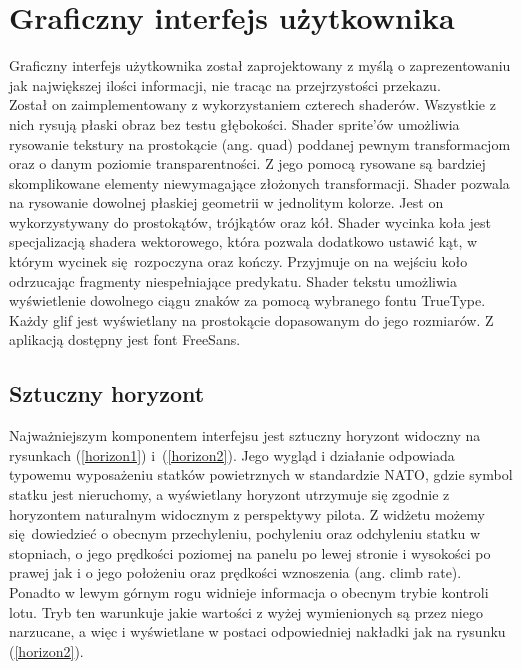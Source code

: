 \section{Graficzny interfejs użytkownika} \label{chapter_gui}

Graficzny interfejs użytkownika został zaprojektowany z myślą o zaprezentowaniu jak największej ilości informacji, nie tracąc na przejrzystości przekazu.
\\

Został on zaimplementowany z wykorzystaniem czterech shaderów. Wszystkie z nich rysują płaski obraz bez testu głębokości. Shader sprite'ów umożliwia rysowanie tekstury na prostokącie (ang. quad) poddanej pewnym transformacjom oraz o danym poziomie transparentności. Z jego pomocą rysowane są bardziej skomplikowane elementy niewymagające złożonych transformacji. Shader pozwala na rysowanie dowolnej płaskiej geometrii w jednolitym kolorze. Jest on wykorzystywany do prostokątów, trójkątów oraz kół. Shader wycinka koła jest specjalizacją shadera wektorowego, która pozwala dodatkowo ustawić kąt, w którym wycinek się rozpoczyna oraz kończy. Przyjmuje on na wejściu koło odrzucając fragmenty niespełniające predykatu. Shader tekstu umożliwia wyświetlenie dowolnego ciągu znaków za pomocą wybranego fontu TrueType. Każdy glif jest wyświetlany na prostokącie dopasowanym do jego rozmiarów. Z aplikacją dostępny jest font FreeSans.

\subsection{Sztuczny horyzont}

Najważniejszym komponentem interfejsu jest sztuczny horyzont widoczny na rysunkach (\ref{horizon1}) i~(\ref{horizon2}). Jego wygląd i działanie odpowiada typowemu wyposażeniu statków powietrznych w standardzie NATO, gdzie symbol statku jest nieruchomy, a wyświetlany horyzont utrzymuje się zgodnie z horyzontem naturalnym widocznym z perspektywy pilota. Z widżetu możemy się dowiedzieć o obecnym przechyleniu, pochyleniu oraz odchyleniu statku w stopniach, o jego prędkości poziomej na panelu po lewej stronie i wysokości po prawej jak i o jego położeniu oraz prędkości wznoszenia (ang. climb rate). Ponadto w lewym górnym rogu widnieje informacja o obecnym trybie kontroli lotu. Tryb ten warunkuje jakie wartości z wyżej wymienionych są przez niego narzucane, a więc i wyświetlane w postaci odpowiedniej nakładki jak na rysunku (\ref{horizon2}).




